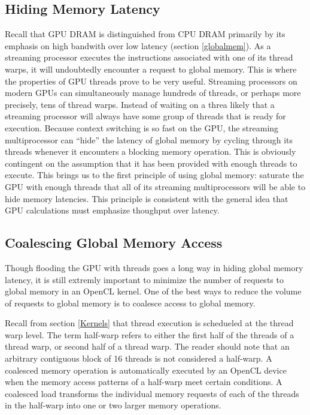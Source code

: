 \documentclass[12pt,twoside]{reedthesis}
\begin{document}
\subsection{Hiding Memory Latency}

Recall that GPU DRAM is distinguished from CPU DRAM primarily by its emphasis on high bandwith over low latency (section \ref{globalmem}). As a streaming processor executes the instructions associated with one of its thread warps, it will undoubtedly encounter a request to global memory.  This is where the properties of GPU threads prove to be very useful. Streaming processors on modern GPUs can simultaneously manage hundreds of threads, or perhaps more precisely, tens of thread warps. Instead of waiting on a threa likely that a streaming processor will always have some group of threads that is ready for execution. Because context switching is so fast on the GPU, the streaming multiprocessor can ``hide'' the latency of global memory by cycling through its threads whenever it encounters a blocking memory operation. This is obviously contingent on the assumption that it has been provided with enough threads to execute. This brings us to the first principle of using global memory: saturate the GPU with enough threads that all of its streaming multiprocessors will be able to hide memory latencies. This principle is consistent with the general idea that GPU calculations must emphasize thoughput over latency.

\subsection{Coalescing Global Memory Access}

Though flooding the GPU with threads goes a long way in hiding global memory latency, it is still extremly important to minimize the number of requests to global memory in an OpenCL kernel. One of the best ways to reduce the volume of requests to global memory is to coalesce access to global memory.

Recall from section \ref{Kernels} that thread execution is schedueled at the thread warp level. The term half-warp refers to either the first half of the threads of a thread warp, or second half of a thread warp. The reader should note that an arbitrary contiguous block of 16 threads is not considered a half-warp.
A coalesced memory operation is automatically executed by an OpenCL device when the memory access patterns of a half-warp meet certain conditions. A coalesced load transforms the individual memory requests of each of the threads in the half-warp into one or two larger memory operations.
\end{document}
